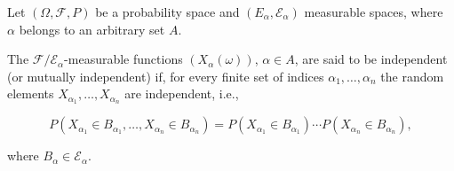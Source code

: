 Let $(\Omega, \mathcal{F}, P)$ be a probability space and $(E_\alpha, \mathcal{E}_\alpha)$ measurable spaces, where $\alpha$ belongs to an arbitrary set $A$.

The $\mathcal{F}/\mathcal{E}_\alpha$-measurable functions $(X_\alpha(\omega))$, $\alpha \in A$, are said to be independent (or mutually independent) if, for every finite set of indices $\alpha_1, \ldots, \alpha_n$ the random elements $X_{\alpha_1}, \ldots, X_{\alpha_n}$ are independent, i.e.,

$$P(X_{\alpha_1} \in B_{\alpha_1}, \ldots, X_{\alpha_n} \in B_{\alpha_n}) = P(X_{\alpha_1} \in B_{\alpha_1}) \cdots P(X_{\alpha_n} \in B_{\alpha_n}),$$

where $B_\alpha \in \mathcal{E}_\alpha$.
